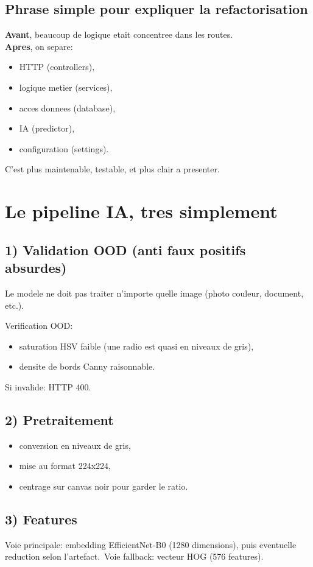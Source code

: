 \documentclass[12pt,a4paper]{article}
\begin{document}
\subsection{Phrase simple pour expliquer la refactorisation}
\textbf{Avant}, beaucoup de logique etait concentree dans les routes.\\
\textbf{Apres}, on separe:
\begin{itemize}
  \item HTTP (controllers),
  \item logique metier (services),
  \item acces donnees (database),
  \item IA (predictor),
  \item configuration (settings).
\end{itemize}
C'est plus maintenable, testable, et plus clair a presenter.

\section{Le pipeline IA, tres simplement}
\subsection{1) Validation OOD (anti faux positifs absurdes)}
Le modele ne doit pas traiter n'importe quelle image (photo couleur, document, etc.).

Verification OOD:
\begin{itemize}
  \item saturation HSV faible (une radio est quasi en niveaux de gris),
  \item densite de bords Canny raisonnable.
\end{itemize}
Si invalide: HTTP 400.

\subsection{2) Pretraitement}
\begin{itemize}
  \item conversion en niveaux de gris,
  \item mise au format 224x224,
  \item centrage sur canvas noir pour garder le ratio.
\end{itemize}

\subsection{3) Features}
Voie principale: embedding EfficientNet-B0 (1280 dimensions), puis eventuelle reduction selon l'artefact.\
Voie fallback: vecteur HOG (576 features).
\end{document}
